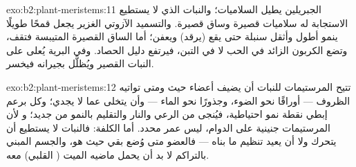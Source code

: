 \begin{solution}{exo:b2:plant-meristems:11}
الجبريلين يطيل السلاميات؛ والنبات الذي لا يستطيع الاستجابة له
سلاميات قصيرة وساق قصيرة. والتسميد الآزوتي الغزير يجعل
قمحًا طويلًا ينمو أطول وأثقل سنبلة حتى يقع
(يرقد) ويعفن؛ أما الساق القصيرة المتيبسة فتقف، وتضع الكربون
الزائد في الحب لا في التبن، فيرتفع دليل الحصاد. وفي
البرية يُعلى على النبات القصير ويُظلَّل بجيرانه
فيخسر.
\end{solution}

\begin{solution}{exo:b2:plant-meristems:12}
تتيح المرستيمات للنبات أن يضيف أعضاء حيث ومتى تواتيه
الظروف --- أوراقًا نحو الضوء، وجذورًا نحو الماء --- وأن يتخلى
عما لا يجدي؛ وكل برعم إبطي نقطة نمو
احتياطية، فيُنجى من الرعي والنار والتقليم بالنمو من جديد؛ و
لأن المرستيمات جنينية على الدوام، ليس  عمر
محدد. أما الكلفة: فالنبات لا يستطيع أن يتحرك ولا أن يعيد تنظيم ما
بناه --- فالعضو متى وُضع بقي حيث هو، والجسم
المبني بالتراكم لا بد أن يحمل ماضيه الميت ( القلبي) معه.
\end{solution}

